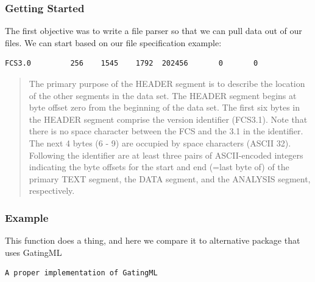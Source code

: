 \documentclass{beamer}
\begin{document}
\begin{frame}[fragile]
  \frametitle{Getting Started} The first objective was to write a file
  parser so that we can pull data out of our files. We can start based
  on our file specification\cite{spidlen2021data} example:
\begin{lstlisting}
FCS3.0         256    1545    1792  202456       0       0 
\end{lstlisting}
\begin{quotation}
  The primary purpose of the HEADER segment is to describe the location
of the other segments in the data set. The HEADER segment begins at
byte offset zero from the beginning of the data set.  The first six
bytes in the HEADER segment comprise the version identifier
(FCS3.1). Note that there is no space character between the FCS and
the 3.1 in the identifier. The next 4 bytes (6 - 9) are occupied by
space characters (ASCII 32). Following the identifier are at least
three pairs of ASCII-encoded integers indicating the byte offsets for
the start and end (=last byte of) of the primary TEXT segment, the
DATA segment, and the ANALYSIS segment, respectively.
\end{quotation}
\cite{parks2008data}
\end{frame}

\begin{frame}[fragile]
  \frametitle{Example}
  This function does a thing, and here we compare it to alternative package that uses GatingML
\begin{lstlisting}
A proper implementation of GatingML
    \end{lstlisting}
\end{frame}

\nocite{*}


\end{document}
